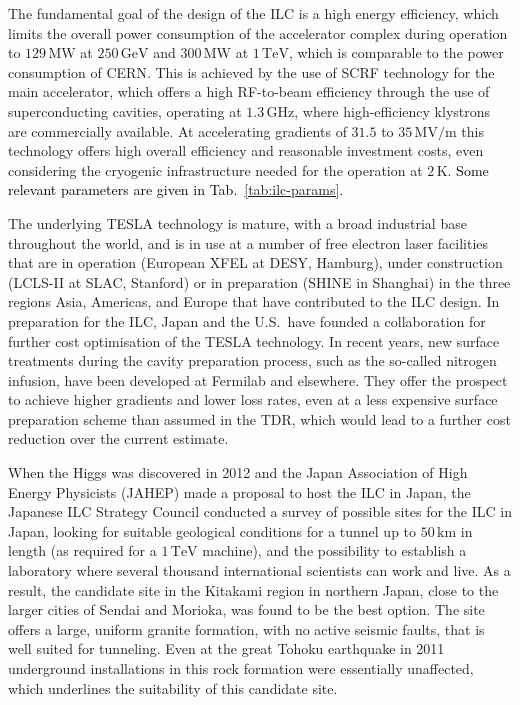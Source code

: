 \documentclass[%
 reprint,
 amsmath,amssymb,
 aps,
]{revtex4-1}
\newcommand{\juan}[1]{\textcolor{black}{{#1}}}
\def\Tab#1{Tab.~\ref{#1}}
\begin{document}
The fundamental goal of the design of the ILC is a high energy efficiency, which limits the overall power consumption of the accelerator complex during operation to $129\,{\mathrm{MW}}$ at  $250\,{\mathrm{GeV}}$ and $300\,{\mathrm{MW}}$ at  $1\,{\mathrm{TeV}}$, which is comparable to the power consumption of CERN.
This is achieved by the use of SCRF technology for the main accelerator, which offers a high RF-to-beam efficiency through the use of superconducting cavities, operating at $1.3\,{\mathrm{GHz}}$, where high-efficiency klystrons are commercially available.
At accelerating gradients of $31.5$ to $35\,{\mathrm{MV/m}}$ this technology offers high overall efficiency and reasonable investment costs, even considering the cryogenic infrastructure needed for the operation at $2\,{\mathrm{K}}$. \juan{Some relevant parameters are given in \Tab{tab:ilc-params}.}

The underlying TESLA technology is mature, with a broad industrial base throughout the world, and is in use at a number of free electron laser facilities that are in operation (European XFEL at DESY, Hamburg), under construction (LCLS-II at SLAC, Stanford) or in preparation (SHINE in Shanghai) in the three regions Asia, Americas, and Europe that have contributed to the ILC design. In preparation for the ILC, Japan and the U.S.\ have founded a collaboration for further cost optimisation of the TESLA technology.
In recent years, new surface treatments during the cavity preparation process, such as the so-called nitrogen infusion, have been developed at Fermilab and elsewhere.
They offer the prospect to achieve higher gradients and lower loss rates, even at a less expensive surface preparation scheme than assumed in the TDR, which would lead to a further cost reduction over the current estimate.

When the Higgs was discovered in 2012 and the Japan Association of High Energy Physicists (JAHEP) made a proposal to host the ILC in Japan,
the Japanese ILC Strategy Council conducted a survey of possible sites for the ILC in Japan, looking for  suitable geological conditions for a tunnel up to $50\,{\mathrm{km}}$ in length (as required for a $1\,{\mathrm{TeV}}$  machine), and the possibility to establish a laboratory where several thousand international scientists can work and live. 
As a result, the candidate site in the Kitakami region in northern Japan, close to the larger cities of Sendai and Morioka, was found to be the best option. 
The site offers a large, uniform granite formation, with no active seismic faults, that is well suited for tunneling.
Even at the great Tohoku earthquake in 2011 underground installations in this rock formation were essentially unaffected, which underlines the suitability of this candidate site. 
\end{document}
